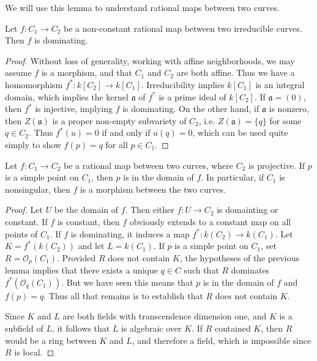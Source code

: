 We will use this lemma to understand rational maps between two curves.

\begin{lemma}
    Let $f: C_1 \to C_2$ be a non-constant rational map between two irreducible curves. Then $f$ is dominating.
\end{lemma}
\begin{proof}
    Without loss of generality, working with affine neighborhoods, we may assume $f$ is a morphism, and that $C_1$ and $C_2$ are both affine. Thus we have a homomorphism $f^*: k[C_2] \to k[C_1]$. Irreducibility implies $k[C_1]$ is an integral domain, which implies the kernel $\mathfrak{a}$ of $f^*$ is a prime ideal of $k[C_2]$. If $\mathfrak{a} = (0)$, then $f^*$ is injective, implying $f$ is dominating. On the other hand, if $\mathfrak{a}$ is nonzero, then $Z(\mathfrak{a})$ is a proper non-empty subvariety of $C_2$, i.e. $Z(\mathfrak{a}) = \{ q \}$ for some $q \in C_2$. Thus $f^*(u) = 0$ if and only if $u(q) = 0$, which can be used quite simply to show $f(p) = q$ for all $p \in C_1$.
\end{proof}

\begin{corollary}
    Let $f: C_1 \to C_2$ be a rational map between two curves, where $C_2$ is projective. If $p$ is a simple point on $C_1$, then $p$ is in the domain of $f$. In particular, if $C_1$ is nonsingular, then $f$ is a morphism between the two curves.
\end{corollary}
\begin{proof}
    Let $U$ be the domain of $f$. Then either $f: U \to C_2$ is domainting or constant. If $f$ is constant, then $f$ obviously extends to a constant map on all points of $C_1$. If $f$ is dominating, it induces a map $f^*: k(C_2) \to k(C_1)$. Let $K = f^*(k(C_2))$ and let $L = k(C_1)$. If $p$ is a simple point on $C_1$, set $R = \mathcal{O}_p(C_1)$. Provided $R$ does not contain $K$, the hypotheses of the previous lemma implies that there exists a unique $q \in C$ such that $R$ dominates $f^*(\mathcal{O}_q(C_1))$. But we have seen this means that $p$ is in the domain of $f$ and $f(p) = q$. Thus all that remains is to establish that $R$ does not contain $K$.

    Since $K$ and $L$ are both fields with transcendence dimension one, and $K$ is a subfield of $L$, it follows that $L$ is algebraic over $K$. If $R$ contained $K$, then $R$ would be a ring between $K$ and $L$, and therefore a field, which is impossible since $R$ is local.
\end{proof}

